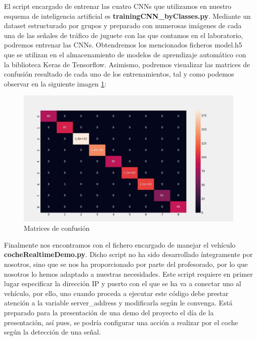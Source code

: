 El script encargado de entrenar las cuatro CNNs que utilizamos en nuestro esquema de inteligencia artificial es \textbf{trainingCNN_byClasses.py}. Mediante un dataset estructurado por grupos y preparado con numerosas imágenes de cada una de las señales de tráfico de juguete con las que contamos en el laboratorio, podremos entrenar las CNNs. Obtendremos los mencionados ficheros model.h5 que se utilizan en el almacenamiento de modelos de aprendizaje automático con la biblioteca Keras de Tensorflow. Asimismo, podremos visualizar las matrices de confusión resultado de cada uno de los entrenamientos, tal y como podemos observar en la siguiente imagen \ref{matriz}:

\begin{figure}[H]
	\centering
	\includegraphics[width=\textwidth]{Imagenes/AnexoI_Manual/AA/ejemplo_matrizConfusion.pdf}
	\caption{Matrices de confusión}
	\label{matriz}
\end{figure}

Finalmente nos encontramos con el fichero encargado de manejar el vehículo \textbf{cocheRealtimeDemo.py}. Dicho script no ha sido desarrollado íntegramente por nosotros, sino que se nos ha proporcionado por parte del profesorado, por lo que nosotros lo hemos adaptado a nuestras necesidades. Este script requiere en primer lugar especificar la dirección IP y puerto con el que se ha va a conectar uno al vehículo, por ello, uno cuando proceda a ejecutar este código debe prestar atención a la variable server_address y modificarla según le convenga. Está preparado para la presentación de una demo del proyecto el día de la presentación, así pues, se podría configurar una acción a realizar por el coche según la detección de una señal.
